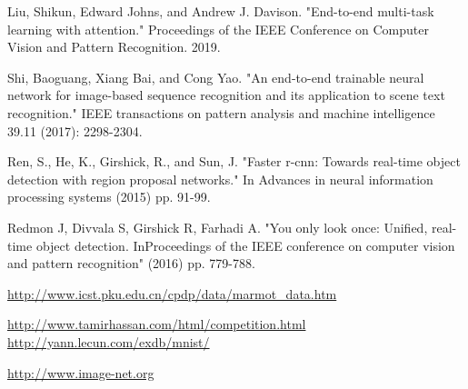 \documentclass[journal]{IEEEtran}
\begin{document}
\begin{thebibliography}{1}
Liu, Shikun, Edward Johns, and Andrew J. Davison. "End-to-end multi-task learning with attention." Proceedings of the IEEE Conference on Computer Vision and Pattern Recognition. 2019.

Shi, Baoguang, Xiang Bai, and Cong Yao. "An end-to-end trainable neural network for image-based sequence recognition and its application to scene text recognition." IEEE transactions on pattern analysis and machine intelligence 39.11 (2017): 2298-2304.

Ren, S., He, K., Girshick, R., and Sun, J. "Faster r-cnn: Towards real-time object detection with region proposal networks."  In Advances in neural information processing systems (2015) pp. 91-99.

Redmon J, Divvala S, Girshick R, Farhadi A. "You only look once: Unified, real-time object detection. InProceedings of the IEEE conference on computer vision and pattern recognition"  (2016)  pp. 779-788.

\url {http://www.icst.pku.edu.cn/cpdp/data/marmot_data.htm}

\url{http://www.tamirhassan.com/html/competition.html}
\url{http://yann.lecun.com/exdb/mnist/}

\url{http://www.image-net.org}

\end{thebibliography}
\end{document}

